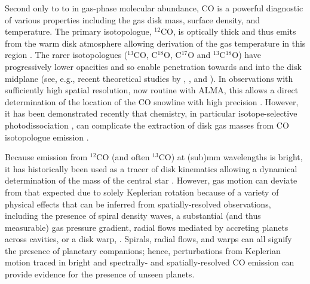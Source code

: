 \documentclass[onecolumn]{aastex6}
\begin{document}
Second only to to  in gas-phase molecular abundance, CO is a powerful
diagnostic of various properties including the gas disk mass, surface density,
and temperature. The primary isotopologue, $^{12}$CO, is
optically thick and thus emits from the warm disk atmosphere allowing derivation
of the gas temperature in this region \citep[e.g.,][]{williams11,dutrey14}. The
rarer isotopologues ($^{13}$CO, C$^{18}$O, C$^{17}$O and $^{13}$C$^{18}$O) have
progressively lower opacities and so enable penetration towards and into the
disk midplane (see, e.g., recent theoretical studies by \citealt{bruderer13},
\citealt{miotello16}, and \citealt{yu16}). In observations with sufficiently
high spatial resolution, now routine with ALMA, this allows a direct
determination of the location of the CO snowline with high precision \citep[see,
e.g.,][]{nomura16,schwarz16,zhang17}. However, it has been demonstrated recently
that chemistry, in particular isotope-selective photodissociation
\citep{visser09}, can complicate the extraction of disk gas masses from CO
isotopologue emission \citep{miotello14,miotello16}.

Because emission from $^{12}$CO (and often $^{13}$CO) at (sub)mm wavelengths is
bright, it has historically been used as a tracer of disk kinematics allowing a
dynamical determination of the mass of the central star
\citep[e.g.,][]{simon00}. However, gas motion can deviate from that expected
due to solely Keplerian rotation because of a variety of physical effects that
can be inferred from spatially-resolved observations, including the presence
of spiral density waves, a substantial (and thus measurable) gas pressure
gradient, radial flows mediated by accreting planets across cavities, or a disk
warp, \citep[see,
e.g.,][]{rosenfeld12,tang12,casassus13,rosenfeld14,christiaens14,casassus15}.
Spirals, radial flows, and warps can all signify the presence of planetary
companions; hence, perturbations from Keplerian motion traced in bright and
spectrally- and spatially-resolved CO emission can provide evidence for the
presence of unseen planets.
\end{document}
